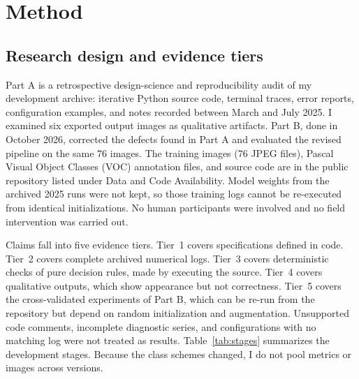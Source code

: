 \documentclass[11pt]{article}
\begin{document}
\section{Method}

\subsection{Research design and evidence tiers}
Part A is a retrospective design-science and reproducibility audit of my development archive: iterative Python source code, terminal traces, error reports, configuration examples, and notes recorded between March and July 2025. I examined six exported output images as qualitative artifacts. Part B, done in October 2026, corrected the defects found in Part A and evaluated the revised pipeline on the same 76 images. The training images (76 JPEG files), Pascal Visual Object Classes (VOC) annotation files, and source code are in the public repository listed under Data and Code Availability. Model weights from the archived 2025 runs were not kept, so those training logs cannot be re-executed from identical initializations. No human participants were involved and no field intervention was carried out.

Claims fall into five evidence tiers. Tier~1 covers specifications defined in code. Tier~2 covers complete archived numerical logs. Tier~3 covers deterministic checks of pure decision rules, made by executing the source. Tier~4 covers qualitative outputs, which show appearance but not correctness. Tier~5 covers the cross-validated experiments of Part B, which can be re-run from the repository but depend on random initialization and augmentation. Unsupported code comments, incomplete diagnostic series, and configurations with no matching log were not treated as results. Table~\ref{tab:stages} summarizes the development stages. Because the class schemes changed, I do not pool metrics or images across versions.
\end{document}
